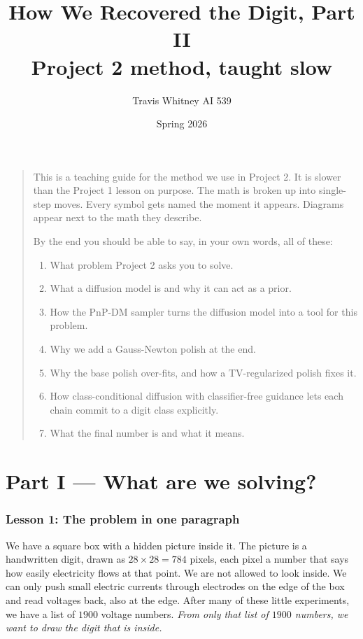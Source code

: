 \documentclass[11pt]{article}
\title{\textbf{How We Recovered the Digit, Part II}\\[6pt]
{\large Project 2 method, taught slow}}
\author{Travis Whitney \quad\textbar\quad AI 539}
\date{Spring 2026}
\begin{document}
\maketitle

\begin{quote}
\small This is a teaching guide for the method we use in Project 2. It is
slower than the Project 1 lesson on purpose. The math is broken up into
single-step moves. Every symbol gets named the moment it appears. Diagrams
appear next to the math they describe.

\par\smallskip
By the end you should be able to say, in your own words, all of these:
\begin{enumerate}[leftmargin=2em]
\item What problem Project 2 asks you to solve.
\item What a diffusion model is and why it can act as a prior.
\item How the PnP-DM sampler turns the diffusion model into a tool for
  this problem.
\item Why we add a Gauss-Newton polish at the end.
\item Why the base polish over-fits, and how a TV-regularized polish
  fixes it.
\item How class-conditional diffusion with classifier-free guidance
  lets each chain commit to a digit class explicitly.
\item What the final number is and what it means.
\end{enumerate}
\end{quote}

{\small\setlength{\parskip}{0pt}\tableofcontents}
\newpage

\part*{Part I --- What are we solving?}

\section{Lesson 1: The problem in one paragraph}

We have a square box with a hidden picture inside it. The picture is a
handwritten digit, drawn as $28 \times 28 = 784$ pixels, each pixel a
number that says how easily electricity flows at that point. We are not
allowed to look inside. We can only push small electric currents through
electrodes on the edge of the box and read voltages back, also at the
edge. After many of these little experiments, we have a list of $1900$
voltage numbers. \emph{From only that list of $1900$ numbers, we want to
draw the digit that is inside.}
\end{document}
